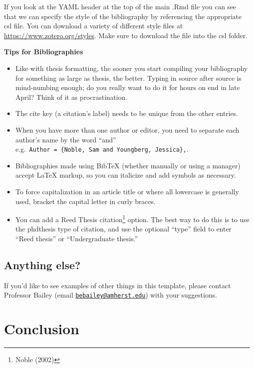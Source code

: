 \documentclass[12pt, twoside]{amherstthesis}
\providecommand{\tightlist}{%
  \setlength{\itemsep}{0pt}\setlength{\parskip}{0pt}}
\theoremstyle{definition}
\theoremstyle{definition}
\theoremstyle{definition}
\theoremstyle{remark}
\begin{document}
If you look at the YAML header at the top of the main .Rmd file you can see that we can specify the style of the bibliography by referencing the appropriate csl file. You can download a variety of different style files at \url{https://www.zotero.org/styles}. Make sure to download the file into the csl folder.

\textbf{Tips for Bibliographies}
\begin{itemize}
\tightlist
\item
  Like with thesis formatting, the sooner you start compiling your bibliography for something as large as thesis, the better. Typing in source after source is mind-numbing enough; do you really want to do it for hours on end in late April? Think of it as procrastination.
\item
  The cite key (a citation's label) needs to be unique from the other entries.
\item
  When you have more than one author or editor, you need to separate each author's name by the word ``and'' e.g.~\texttt{Author\ =\ \{Noble,\ Sam\ and\ Youngberg,\ Jessica\},}.
\item
  Bibliographies made using BibTeX (whether manually or using a manager) accept LaTeX markup, so you can italicize and add symbols as necessary.
\item
  To force capitalization in an article title or where all lowercase is generally used, bracket the capital letter in curly braces.
\item
  You can add a Reed Thesis citation\footnote{Noble (2002)} option. The best way to do this is to use the phdthesis type of citation, and use the optional ``type'' field to enter ``Reed thesis'' or ``Undergraduate thesis.''
\end{itemize}
\hypertarget{anything-else}{%
\section{Anything else?}\label{anything-else}}

If you'd like to see examples of other things in this template, please contact Professor Bailey (email \href{mailto:bebailey@amherst.edu}{\nolinkurl{bebailey@amherst.edu}}) with your suggestions.

\hypertarget{conclusion-1}{%
\chapter*{Conclusion}\label{conclusion-1}}
\end{document}

